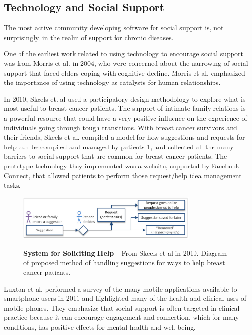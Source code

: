   \subsection{Technology and Social Support}
    The most active community developing software for social support is,
    not surprisingly, in the realm of support for chronic diseases.

    One of the earliest work related to using technology to encourage social
    support was from Morris et al. in 2004,
    who were concerned about the narrowing of social support that faced
    elders coping with cognitive decline.
    Morris et al. emphasized the importance of using technology
    as catalysts for human relationships.
    \cite{morris04}

    In 2010, Skeels et. al used a participatory design methodology to explore what is most useful
    to breast cancer patients.
    \cite{skeels10}
    The support of intimate family relations is a powerful
    resource that could
    have a very positive influence on the experience of individuals going through
    tough transitions.
    With breast cancer survivors and their friends, Skeels et al. compiled a model for how
    suggestions and requests for help can be compiled and managed by patients \ref{fig:skeels_diagram},
    and collected all the many barriers to social support that are common for breast cancer patients.
    The prototype technology they implemented was a website, supported by Facebook Connect,
    that allowed patients to perform those request/help idea management tasks.

      \begin{figure}
      \caption{\textbf{System for Soliciting Help} --
      From Skeels et al in 2010. Diagram of proposed method of handling suggestions for ways
      to help breast cancer patients.
      }
      \centering
      \includegraphics[width=0.80\textwidth]{skeels.png}
      \label{fig:skeels_diagram}
      \end{figure}

    Luxton et al. performed a survey of the many mobile applications available
    to smartphone users in 2011 and
    highlighted many of the health and clinical uses of mobile phones.
    They emphasize that social support is often targeted in clinical practice because
    it can encourage engagement and connection,
    which for many conditions, has positive effects for mental health and well being.
    \cite{luxton11}
